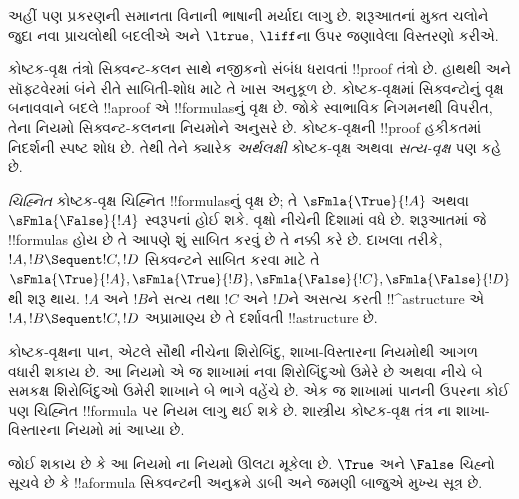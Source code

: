\documentclass[../../../include/open-logic-section]{subfiles}
\begin{document}


અહીં પણ પ્રકરણની સમાનતા વિનાની ભાષાની મર્યાદા
લાગુ છે. શરૂઆતનાં મુક્ત ચલોને જુદા નવા પ્રાચલોથી
બદલીએ અને $\ltrue$, $\liff$ના ઉપર જણાવેલા
વિસ્તરણો કરીએ.

કોષ્ટક-વૃક્ષ તંત્રો સિક્વન્ટ-કલન સાથે નજીકનો સંબંધ ધરાવતાં
!!{proof} તંત્રો છે. હાથથી અને સૉફ્ટવેરમાં બંને રીતે
સાબિતી-શોધ માટે તે ખાસ અનુકૂળ છે. કોષ્ટક-વૃક્ષમાં
સિક્વન્ટોનું વૃક્ષ બનાવવાને બદલે !!a{proof} એ
!!{formula}sનું વૃક્ષ છે. જોકે સ્વાભાવિક નિગમનથી
વિપરીત, તેના નિયમો સિક્વન્ટ-કલનના નિયમોને અનુસરે છે.
કોષ્ટક-વૃક્ષની !!{proof} હકીકતમાં નિદર્શની સ્પષ્ટ શોધ
છે. તેથી તેને ક્યારેક \emph{અર્થલક્ષી} કોષ્ટક-વૃક્ષ
અથવા \emph{સત્ય-વૃક્ષ} પણ કહે છે.

\emph{ચિહ્નિત} કોષ્ટક-વૃક્ષ ચિહ્નિત !!{formula}sનું
વૃક્ષ છે; તે $\sFmla{\True}{!A}$ અથવા
$\sFmla{\False}{!A}$ સ્વરૂપનાં હોઈ શકે.
વૃક્ષો નીચેની દિશામાં વધે છે. શરૂઆતમાં જે
!!{formula}s હોય છે તે આપણે શું સાબિત કરવું છે
તે નક્કી કરે છે. દાખલા તરીકે,
$!A, !B \Sequent !C, !D$ સિક્વન્ટને સાબિત
કરવા માટે તે
$\sFmla{\True}{!A}, \sFmla{\True}{!B},
\sFmla{\False}{!C}, \sFmla{\False}{!D}$થી
શરૂ થાય.
$!A$ અને $!B$ને સત્ય તથા $!C$ અને $!D$ને
અસત્ય કરતી !!^a{structure} એ
$!A, !B \Sequent !C, !D$ અપ્રામાણ્ય છે તે
દર્શાવતી !!a{structure} છે.

કોષ્ટક-વૃક્ષના પાન, એટલે સૌથી નીચેના શિરોબિંદુ,
શાખા-વિસ્તારના નિયમોથી આગળ વધારી શકાય છે. આ
નિયમો એ જ શાખામાં નવા શિરોબિંદુઓ ઉમેરે છે અથવા
નીચે બે સમકક્ષ શિરોબિંદુઓ ઉમેરી શાખાને બે ભાગે
વહેંચે છે. એક જ શાખામાં પાનની ઉપરના કોઈ પણ
ચિહ્નિત !!{formula} પર નિયમ લાગુ થઈ શકે છે.
શાસ્ત્રીય કોષ્ટક-વૃક્ષ તંત્ર ના
શાખા-વિસ્તારના નિયમો માં આપ્યા છે.



જોઈ શકાય છે કે આ નિયમો ના નિયમો ઊલટા
મૂકેલા છે. $\True$ અને $\False$ ચિહ્નો સૂચવે છે કે
!!a{formula} સિક્વન્ટની અનુક્રમે ડાબી અને જમણી
બાજુએ મુખ્ય સૂત્ર છે.
\end{document}
